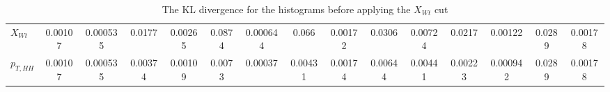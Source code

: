 \begin{table}
\begin{adjustbox}{width=\columnwidth,center}
\begin{tabular}{lcccccccccccccc}
$X_{Wt}$           &  0.00107 & 0.000535 &   0.0177 & 0.00265 &     0.0874 & 0.000644 &       0.066 & 0.00172 &      0.0306 & 0.00724 &     0.0217 &  0.00122 &  0.0289 & 0.00178 \\
$p_{T,HH}$         &  0.00107 & 0.000535 &  0.00374 & 0.00109 &     0.0073 &  0.00037 &     0.00431 & 0.00174 &     0.00644 & 0.00441 &    0.00223 & 0.000942 &  0.0289 & 0.00178 \\
\bottomrule
\end{tabular}
\end{adjustbox}\caption{The KL divergence for the histograms before applying the $X_{Wt}$ cut}\end{table}
